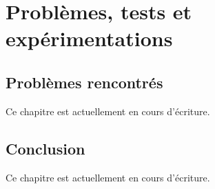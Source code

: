 \documentclass[
	headsepline=on,
	footsepline=on,
	twoside=off,
	abstract=on,
	DIV=10
]{scrreprt}
\begin{document}
	\part{Problèmes, tests et expérimentations}
	
		\chapter{Problèmes rencontrés}
		
		\begin{info}
			Ce chapitre est actuellement en cours d'écriture.
		\end{info}
%			
				
			
		\chapter{Conclusion}
		
		\begin{info}
			Ce chapitre est actuellement en cours d'écriture.
		\end{info}
		
%			
%			
%			
%			
%			
%		
			\cleardoublepage
			\pagebreak
			
\end{document}
